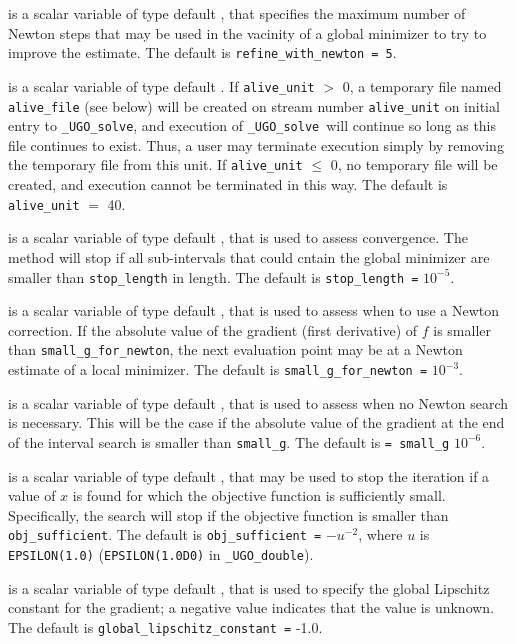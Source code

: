 \documentclass{galahad}
\newcommand{\packagename}{UGO}
\newcommand{\fullpackagename}{\libraryname\_\packagename}
\newcommand{\solver}{{\tt \fullpackagename\_solve}}
\begin{document}
\begin{description}
 is a scalar variable of type default \integer, that
specifies the maximum number of Newton steps that may be used in the
vacinity of a global  minimizer to try to improve the estimate.
The default is {\tt refine\_with\_newton = 5}.

 is a scalar variable of type default \integer.
If {\tt alive\_unit} $>$ 0, a temporary file named {\tt alive\_file} (see below)
will be created on stream number {\tt alive\_unit} on initial entry to
\solver, and execution of \solver\ will continue so
long as this file continues to exist. Thus, a user may terminate execution
simply by removing the temporary file from this unit.
If {\tt alive\_unit} $\leq$ 0, no temporary file will be created, and
execution cannot be terminated in this way.
The default is {\tt alive\_unit} $=$ 40.

 is a scalar variable of type default \realdp, that is used to
assess convergence. The method will stop if all sub-intervals that could
cntain the global minimizer are smaller than {\tt stop\_length} in length.
The default is {\tt stop\_length =} $10^{-5}$.

 is a scalar variable of type default \realdp,
that is used to assess when to use a Newton correction. If the absolute value
of the gradient (first derivative) of $f$ is smaller than
{\tt small\_g\_for\_newton}, the next evaluation point may be at a
Newton estimate of a local minimizer.
The default is {\tt small\_g\_for\_newton =} $10^{-3}$.

 is a scalar variable of type default \realdp, that is used to
assess when no Newton search is necessary. This will be the case if
the absolute value of the gradient at the end of the interval search is
smaller than {\tt small\_g}.
The default is {\tt = small\_g} $10^{-6}$.

 is a scalar variable of type default \realdp,
that may be used to stop the iteration if a value of $x$ is found for which
the objective function is sufficiently small. Specifically, the search
will stop if the objective function is smaller than {\tt obj\_sufficient}.
The default is {\tt obj\_sufficient =} $-u^{-2}$,
where $u$ is {\tt EPSILON(1.0)} ({\tt EPSILON(1.0D0)} in
{\tt \fullpackagename\_double}).

 is a scalar variable of type default \realdp,
that is used to specify the global Lipschitz constant for the gradient;
a negative value indicates that the value is unknown.
The default is {\tt global\_lipschitz\_constant =} -1.0.


\end{description}
\end{document}
